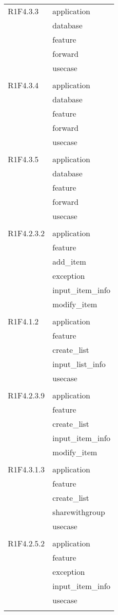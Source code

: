 \begin{center}
\begin{longtable}{|p{7cm}|p{5cm}|}
		R1F4.3.3 & application \\ & database \\ & feature \\ & forward \\ & usecase \\ & \\ \hline
		R1F4.3.4 & application \\ & database \\ & feature \\ & forward \\ & usecase \\ & \\ \hline
		R1F4.3.5 & application \\ & database \\ & feature \\ & forward \\ & usecase \\ & \\ \hline
		R1F4.2.3.2 & application \\ & feature \\ & add\_item \\ & exception \\ & input\_item\_info \\ & modify\_item \\ & \\ \hline
		R1F4.1.2 & application \\ & feature \\ & create\_list \\ & input\_list\_info \\ & usecase \\ & \\ \hline
		R1F4.2.3.9 & application \\ & feature \\ & create\_list \\ & input\_item\_info \\ & modify\_item \\ & \\ \hline
		R1F4.3.1.3 & application \\ & feature \\ & create\_list \\ & sharewithgroup \\ & usecase \\ & \\ \hline
		R1F4.2.5.2 & application \\ & feature \\ & exception \\ & input\_item\_info \\ & usecase \\ & \\ \hline

\end{longtable}
\end{center}
